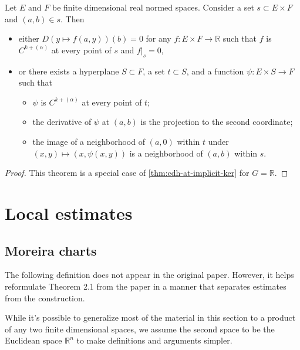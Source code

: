\begin{theorem}%
  \label{thm:cdh-at-implicit-dichotomy}
  Let \(E\) and \(F\) be finite dimensional real normed spaces.
  Consider a set \(s \subset E \times F\) and \((a, b) \in s\).
  Then
  \begin{itemize}
  \item either \(D(y \mapsto f(a, y))(b) = 0\) for any \(f\colon E \times F\to \mathbb R\)
    such that \(f\) is \(C^{k+(\alpha)}\) at every point of \(s\) and \(\left.f\right|_{s}=0\),
  \item or there exists a hyperplane \(S \subset F\), a set \(t \subset S\), and a function \(\psi\colon E \times S \to F\) such that
    \begin{itemize}
    \item \(\psi\) is \(C^{k+(\alpha)}\) at every point of \(t\);
    \item the derivative of \(\psi\) at \((a, b)\) is the projection to the second coordinate;
    \item the image of a neighborhood of \((a, 0)\) within \(t\) under \((x, y) \mapsto (x, \psi(x, y))\)
      is a neighborhood of \((a, b)\) within \(s\).
    \end{itemize}
  \end{itemize}
\end{theorem}

\begin{proof}
  This theorem is a special case of \autoref{thm:cdh-at-implicit-ker} for \(G=\mathbb R\).
\end{proof}

\chapter{Local estimates}%
\label{cha:local-estimates}

\section{Moreira charts}%
\label{sec:moreira-chart}

The following definition does not appear in the original paper.
However, it helps reformulate Theorem 2.1 from the paper
in a manner that separates estimates from the construction.

While it's possible to generalize most of the material in this section
to a product of any two finite dimensional spaces,
we assume the second space to be the Euclidean space \(\mathbb R^{n}\)
to make definitions and arguments simpler.

